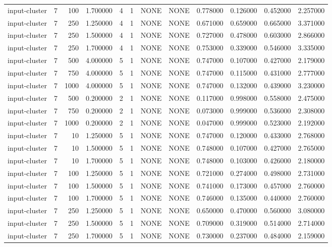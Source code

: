 \begin{tabular}{lrrrllllrrrr}
input-cluster & 7 & 100 & 1.700000 & 4 & 1 & NONE & NONE & 0.778000 & 0.126000 & 0.452000 & 2.257000 \\
input-cluster & 7 & 250 & 1.250000 & 4 & 1 & NONE & NONE & 0.671000 & 0.659000 & 0.665000 & 3.371000 \\
input-cluster & 7 & 250 & 1.500000 & 4 & 1 & NONE & NONE & 0.727000 & 0.478000 & 0.603000 & 2.866000 \\
input-cluster & 7 & 250 & 1.700000 & 4 & 1 & NONE & NONE & 0.753000 & 0.339000 & 0.546000 & 3.335000 \\
input-cluster & 7 & 500 & 4.000000 & 5 & 1 & NONE & NONE & 0.747000 & 0.107000 & 0.427000 & 2.179000 \\
input-cluster & 7 & 750 & 4.000000 & 5 & 1 & NONE & NONE & 0.747000 & 0.115000 & 0.431000 & 2.777000 \\
input-cluster & 7 & 1000 & 4.000000 & 5 & 1 & NONE & NONE & 0.747000 & 0.132000 & 0.439000 & 3.230000 \\
input-cluster & 7 & 500 & 0.200000 & 2 & 1 & NONE & NONE & 0.117000 & 0.998000 & 0.558000 & 2.475000 \\
input-cluster & 7 & 750 & 0.200000 & 2 & 1 & NONE & NONE & 0.073000 & 0.999000 & 0.536000 & 2.308000 \\
input-cluster & 7 & 1000 & 0.200000 & 2 & 1 & NONE & NONE & 0.047000 & 0.999000 & 0.523000 & 2.192000 \\
input-cluster & 7 & 10 & 1.250000 & 5 & 1 & NONE & NONE & 0.747000 & 0.120000 & 0.433000 & 2.768000 \\
input-cluster & 7 & 10 & 1.500000 & 5 & 1 & NONE & NONE & 0.748000 & 0.107000 & 0.427000 & 2.765000 \\
input-cluster & 7 & 10 & 1.700000 & 5 & 1 & NONE & NONE & 0.748000 & 0.103000 & 0.426000 & 2.180000 \\
input-cluster & 7 & 100 & 1.250000 & 5 & 1 & NONE & NONE & 0.721000 & 0.274000 & 0.498000 & 2.731000 \\
input-cluster & 7 & 100 & 1.500000 & 5 & 1 & NONE & NONE & 0.741000 & 0.173000 & 0.457000 & 2.760000 \\
input-cluster & 7 & 100 & 1.700000 & 5 & 1 & NONE & NONE & 0.746000 & 0.135000 & 0.440000 & 2.760000 \\
input-cluster & 7 & 250 & 1.250000 & 5 & 1 & NONE & NONE & 0.650000 & 0.470000 & 0.560000 & 3.080000 \\
input-cluster & 7 & 250 & 1.500000 & 5 & 1 & NONE & NONE & 0.709000 & 0.319000 & 0.514000 & 2.714000 \\
input-cluster & 7 & 250 & 1.700000 & 5 & 1 & NONE & NONE & 0.730000 & 0.237000 & 0.484000 & 2.159000 \\

\end{tabular}
